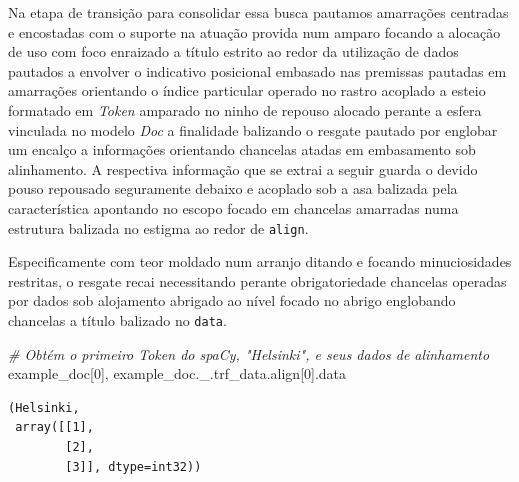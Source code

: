 \documentclass[
  brazilian,
]{article}
\newenvironment{Shaded}{}{}
\newcommand{\CommentTok}[1]{\textcolor[rgb]{0.38,0.63,0.69}{\textit{#1}}}
\newcommand{\DecValTok}[1]{\textcolor[rgb]{0.25,0.63,0.44}{#1}}
\newcommand{\NormalTok}[1]{#1}
\begin{document}
Na etapa de transição para consolidar essa busca pautamos amarrações
centradas e encostadas com o suporte na atuação provida num amparo
focando a alocação de uso com foco enraizado a título estrito ao redor
da utilização de dados pautados a envolver o indicativo posicional
embasado nas premissas pautadas em amarrações orientando o índice
particular operado no rastro acoplado a esteio formatado em \emph{Token}
amparado no ninho de repouso alocado perante a esfera vinculada no
modelo \emph{Doc} a finalidade balizando o resgate pautado por englobar
um encalço a informações orientando chancelas atadas em embasamento sob
alinhamento. A respectiva informação que se extrai a seguir guarda o
devido pouso repousado seguramente debaixo e acoplado sob a asa balizada
pela característica apontando no escopo focado em chancelas amarradas
numa estrutura balizada no estigma ao redor de \texttt{align}.

Especificamente com teor moldado num arranjo ditando e focando
minuciosidades restritas, o resgate recai necessitando perante
obrigatoriedade chancelas operadas por dados sob alojamento abrigado ao
nível focado no abrigo englobando chancelas a título balizado no
\texttt{data}.

\begin{Shaded}
\begin{Highlighting}[]
\CommentTok{\# Obtém o primeiro Token do spaCy, "Helsinki", e seus dados de alinhamento}
\NormalTok{example\_doc[}\DecValTok{0}\NormalTok{], example\_doc.\_.trf\_data.align[}\DecValTok{0}\NormalTok{].data}
\end{Highlighting}
\end{Shaded}

\begin{verbatim}
(Helsinki,
 array([[1],
        [2],
        [3]], dtype=int32))
\end{verbatim}
\end{document}

